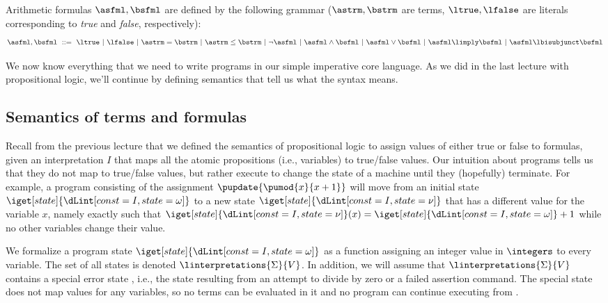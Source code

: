 \documentclass[11pt,twoside]{scrartcl}
\begin{document}
\begin{definition}
\label{def:arith-syntax}
Arithmetic formulas $\asfml,\bsfml$ are defined by the following grammar ($\astrm,\bstrm$ are terms, $\ltrue,\lfalse$ are literals corresponding to \emph{true} and \emph{false}, respectively):
\[
  \asfml,\bsfml ~\bebecomes~
  \ltrue
  \alternative
  \lfalse
  \alternative
  \astrm = \bstrm
  \alternative
  \astrm \le \bstrm
  \alternative
  \lnot \asfml
  \alternative
  \asfml \land \bsfml
  \alternative
  \asfml \lor \bsfml  
  \alternative
  \asfml \limply \bsfml
  \alternative
  \asfml \lbisubjunct \bsfml    
\]
\end{definition}

We now know everything that we need to write programs in our simple imperative core language. As we did in the last lecture with propositional logic, we'll continue by defining semantics that tell us what the syntax means.

\subsection{Semantics of terms and formulas}

Recall from the previous lecture that we defined the semantics of propositional logic to assign values of either true or false to formulas, given an interpretation $I$ that maps all the atomic propositions (i.e., variables) to true/false values. Our intuition about programs tells us that they do not map to true/false values, but rather execute to change the state of a machine until they (hopefully) terminate. For example, a program consisting of the assignment \(\pupdate{\pumod{x}{x+1}}\) will move from an initial state $\iget[state]{\I}$ to a new state $\iget[state]{\It}$ that has a different value for the variable $x$, namely exactly such that \(\iget[state]{\It}(x)=\iget[state]{\I}+1\) while no other variables change their value.

We formalize a program state $\iget[state]{\I}$ as a function assigning an integer value in $\integers$ to every variable.
The set of all states is denoted \(\linterpretations{\Sigma}{V}\). In addition, we will assume that \(\linterpretations{\Sigma}{V}\) contains a special error state \errstate, i.e., the state resulting from an attempt to divide by zero or a failed assertion command. The special state \errstate does not map values for any variables, so no terms can be evaluated in it and no program can continue executing from \errstate.
\end{document}
